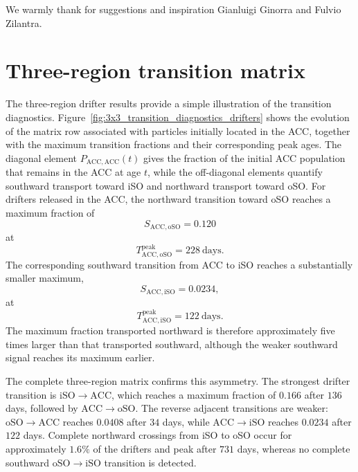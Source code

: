 \documentclass[
  draft
]{agujournal2025}
\begin{document}
We warmly thank for suggestions and inspiration Gianluigi Ginorra and Fulvio Zilantra.

%



\appendix  %

\section{Three-region transition matrix}
    \label{app:3_regions}
    The three-region drifter results provide a simple illustration of the transition diagnostics. Figure~\ref{fig:3x3_transition_diagnostics_drifters} shows the evolution of the matrix row associated with particles initially located in the ACC, together with the maximum transition fractions and their corresponding peak ages. The diagonal element $P_{\mathrm{ACC},\mathrm{ACC}}(t)$ gives the fraction of the initial ACC population that remains in the ACC at age $t$, while the off-diagonal elements quantify southward transport toward iSO and northward transport toward oSO. For drifters released in the ACC, the northward transition toward oSO reaches a maximum fraction of
    \begin{equation}
        S_{\mathrm{ACC},\mathrm{oSO}}=0.120
    \end{equation}
    at
    \begin{equation}
        T_{\mathrm{ACC},\mathrm{oSO}}^{\mathrm{peak}} = 228~\mathrm{days}.
    \end{equation}
    The corresponding southward transition from ACC to iSO reaches a substantially smaller maximum,
    \begin{equation}
        S_{\mathrm{ACC},\mathrm{iSO}}=0.0234,
    \end{equation}
    at
    \begin{equation}
        T_{\mathrm{ACC},\mathrm{iSO}}^{\mathrm{peak}}
        =122~\mathrm{days}.
    \end{equation}
    The maximum fraction transported northward is therefore approximately five times larger than that transported southward, although the weaker southward signal reaches its maximum earlier.

    The complete three-region matrix confirms this asymmetry. The strongest drifter transition is $\mathrm{iSO} \rightarrow \mathrm{ACC}$, which reaches a maximum fraction of $0.166$ after $136$ days, followed by $\mathrm{ACC} \rightarrow \mathrm{oSO}$. The reverse adjacent transitions are weaker: $\mathrm{oSO} \rightarrow \mathrm{ACC}$ reaches $0.0408$ after $34$ days, while $\mathrm{ACC} \rightarrow \mathrm{iSO}$ reaches $0.0234$ after $122$ days. Complete northward crossings from iSO to oSO occur for approximately $1.6\%$ of the drifters and peak after $731$ days, whereas no complete southward $\mathrm{oSO} \rightarrow \mathrm{iSO}$ transition is detected.
\end{document}
